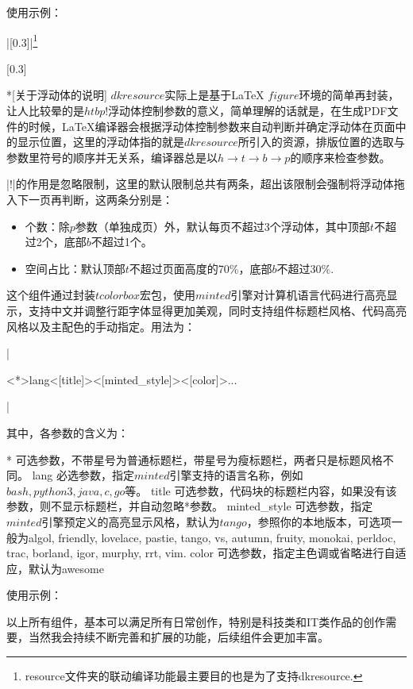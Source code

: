使用示例：

|[0.3]|\footnote{resource文件夹的联动编译功能最主要目的也是为了支持dkresource.}

[0.3]

\begin{dkcomment}*[关于浮动体的说明]
  \hspace{2em}$dkresource$实际上是基于{\LaTeX} $figure$环境的简单再封装，让人比较晕的是$htbp!$浮动体控制参数的意义，简单理解的话就是，在生成PDF文件的时候，{\LaTeX}编译器会根据浮动体控制参数来自动判断并确定浮动体在页面中的显示位置，这里的浮动体指的就是$dkresource$所引入的资源，排版位置的选取与参数里符号的顺序并无关系，编译器总是以$h \to t \to b \to p$的顺序来检查参数。

  \hspace{2em}|!|的作用是忽略限制，这里的默认限制总共有两条，超出该限制会强制将浮动体拖入下一页再判断，这两条分别是：

  \begin{itemize}
    \item 个数：除$p$参数（单独成页）外，默认每页不超过3个浮动体，其中顶部$t$不超过2个，底部$b$不超过1个。
    \item 空间占比：默认顶部$t$不超过页面高度的70\%，底部$b$不超过30\%.
  \end{itemize}
\end{dkcomment}

这个组件通过封装$tcolorbox$宏包，使用$minted$引擎对计算机语言代码进行高亮显示，支持中文并调整行距字体显得更加美观，同时支持组件标题栏风格、代码高亮风格以及主配色的手动指定。用法为：

|\begin{dkcode}<*>{lang}<[title]><[minted_style]><[color]>...\end{dkcode}|

其中，各参数的含义为：

\begin{cvskills}
  \cvskill
  {*}
  {可选参数，不带星号为普通标题栏，带星号为瘦标题栏，两者只是标题风格不同。}
  \cvskill
  {lang}
  {必选参数，指定$minted$引擎支持的语言名称，例如$bash, python3, java, c, go$等。}
  \cvskill
  {title}
  {可选参数，代码块的标题栏内容，如果没有该参数，则不显示标题栏，并自动忽略*参数。}
  \cvskill
  {minted\_style}
  {可选参数，指定$minted$引擎预定义的高亮显示风格，默认为$tango$，参照你的本地版本，可选项一般为algol, friendly, lovelace, pastie, tango, vs, autumn, fruity, monokai, perldoc, trac, borland, igor, murphy, rrt, vim.}
  \cvskill
  {color}
  {可选参数，指定主色调或省略进行自适应，默认为awesome}
\end{cvskills}

使用示例：






以上所有组件，基本可以满足所有日常创作，特别是科技类和IT类作品的创作需要，当然我会持续不断完善和扩展{\dk}的功能，后续组件会更加丰富。


\clearpage
